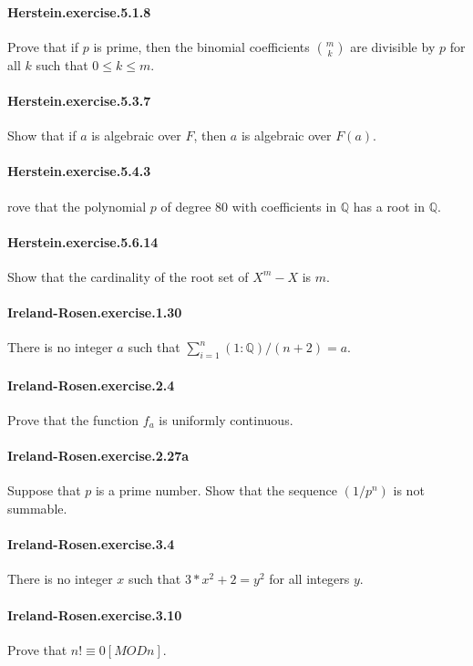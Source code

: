 \documentclass{article}
\begin{document}
{\paragraph{Herstein.exercise.5.1.8} Prove that if $p$ is prime, then the binomial coefficients $\binom{m}{k}$ are divisible by $p$ for all $k$ such that $0 ≤ k ≤ m$.

\paragraph{Herstein.exercise.5.3.7} Show that if $a$ is algebraic over $F$, then $a$ is algebraic over $F(a)$.

\paragraph{Herstein.exercise.5.4.3} rove that the polynomial $p$ of degree $80$ with coefficients in $\mathbb{Q}$ has a root in $\mathbb{Q}$.

\paragraph{Herstein.exercise.5.6.14} Show that the cardinality of the root set of $X^m - X$ is $m$.

\paragraph{Ireland-Rosen.exercise.1.30} There is no integer $a$ such that $\sum_{i=1}^n (1 : ℚ) / (n+2) = a$.

\paragraph{Ireland-Rosen.exercise.2.4} Prove that the function $f_a$ is uniformly continuous.

\paragraph{Ireland-Rosen.exercise.2.27a} Suppose that $p$ is a prime number. Show that the sequence $(1 / p^n)$ is not summable.

\paragraph{Ireland-Rosen.exercise.3.4} There is no integer $x$ such that $3*x^2 + 2 = y^2$ for all integers $y$.

\paragraph{Ireland-Rosen.exercise.3.10} Prove that $n! ≡ 0 [MOD n]$.

}
\end{document}
